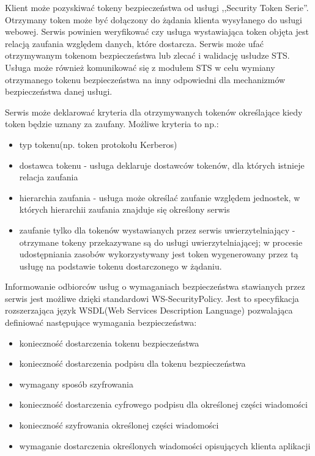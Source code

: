 		Klient może pozyskiwać tokeny bezpieczeństwa od usługi ,,Security Token Serie''. Otrzymany token może być dołączony do żądania klienta wysyłanego do usługi webowej. Serwis powinien weryfikować czy usługa wystawiająca token objęta jest relacją zaufania względem danych, które dostarcza. Serwis może ufać otrzymywanym tokenom bezpieczeństwa lub zlecać i walidację usłudze STS. Usługa może również komunikować się z modułem STS w celu wymiany otrzymanego tokenu bezpieczeństwa na inny odpowiedni dla mechanizmów bezpieczeństwa danej usługi. 

		Serwis może deklarować kryteria dla otrzymywanych tokenów określające kiedy token będzie uznany za zaufany\cite{WS-Trust-1.4-with-errata}. Możliwe kryteria to np.:

		\begin{itemize}
			\item typ tokenu(np. token protokołu Kerberos)
			\item dostawca tokenu - usługa deklaruje dostawców tokenów, dla których istnieje relacja zaufania
			\item hierarchia zaufania - usługa może określać zaufanie względem jednostek, w których hierarchii zaufania znajduje się określony serwis
			\item zaufanie tylko dla tokenów wystawianych przez serwis uwierzytelniający - otrzymane tokeny przekazywane są do usługi uwierzytelniającej; w procesie udostępniania zasobów wykorzystywany jest token wygenerowany przez tą usługę na podstawie tokenu dostarczonego w żądaniu. 
		\end{itemize} 
		
	Informowanie odbiorców usług o wymaganiach bezpieczeństwa stawianych przez serwis jest możliwe dzięki standardowi WS-SecurityPolicy. Jest to specyfikacja rozszerzająca język WSDL(Web Services Description Language) pozwalająca definiować następujące wymagania bezpieczeństwa:

	\begin{itemize}
		\item konieczność dostarczenia tokenu bezpieczeństwa
		\item konieczność dostarczenia podpisu dla tokenu bezpieczeństwa
		\item wymagany sposób szyfrowania
		\item konieczność dostarczenia cyfrowego podpisu dla określonej części wiadomości
		\item konieczność szyfrowania określonej części wiadomości
		\item wymaganie dostarczenia określonych wiadomości opisujących klienta aplikacji
	\end{itemize} 

